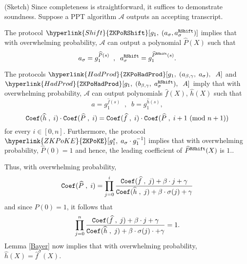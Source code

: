 \documentclass[11pt, lettersize, notitlepage, leqno, footskip=0.6cm]{article}
\newcommand{\mc}{\mathcal}
\newcommand{\be}{\beta}
\newcommand{\what}{\widehat}
\newcommand{\vs}{\vspace{-0.15cm}}
\newcommand{\noin}{\noindent}
\newcommand{\op}{overwhelming probability}
\newcommand{\Mod}[1]{\ (\mathrm{mod}\ #1)}
\numberwithin{equation}{section}
\begin{document}
\begin{prf} (Sketch) Since completeness is straightforward, it suffices to demonstrate soundness. Suppose a PPT algorithm $\mc{A}$ outputs an accepting transcript. 

The protocol $\hyperlink{Shift}{\tt{ZKPoRShift}}[g_1,\;(a_{\sigma}, a^{{\tt{RShift}}}_{\sigma})] $ implies that with \op, $\mc{A}$ can output a polynomial $\what{P}(X)$ such that \vs $$ a_{\sigma} = g_1^{\what{P}(s)}\;\;,\;\; a^{{\tt{RShift}}}_{\sigma} = g_1^{\what{P}^{{\tt{RShift}}}(s)} . $$

\noin The protocols $\hyperlink{HadProd}{\tt{ZKPoHadProd}}[g_1,\;({a}_{\be,\gamma},\;a_{\sigma}),\;\;A] $ and $\hyperlink{HadProd}{\tt{ZKPoHadProd}}[g_1,\;({b}_{\be,\gamma},\;a^{{\tt{RShift}}}_{\sigma}),\;\;A] $ imply that with \op, $\mc{A}$ can output polynomials $\what{f}(X)$, $\what{h}(X)$ such that \vs $$ a = g_1^{\what{f}(s)}\;\;,\;\; b = g_1^{\what{h}(s)}, $$ \vspace{-3mm}  $${\tt{Coef}}(\what{h}\;,\;i)\cdot {\tt{Coef}}(\what{P}\;,\;i) = {\tt{Coef}}(\what{f}\;,\;i)\cdot {\tt{Coef}}(\what{P}\;,\;i+1\Mod{n+1}) $$ for every $i\in [0, n]$. Furthermore, the protocol $\hyperlink{ZKPoKE}{\tt{ZKPoKE}}[g_1^{s},\;a_{\sigma}\cdot g_1^{-1}]$ implies that with \op, $\what{P}(0) = 1$ and hence, the leading coefficient of $\what{P}^{\tt{RShift}}(X)$ is $1$.. 

Thus, with \op, \vs $$ {\tt{Coef}}(\what{P}\;,\;i ) = \prod\limits_{j=0}^i \frac{{\tt{Coef}}(\what{f}\;,\;j) +\be\cdot j + \gamma }{ {\tt{Coef}}(\what{h}\;,\;j)+\be\cdot \sigma(j) + \gamma } $$ and since $P(0)=1$, it follows that \vs $$ \prod\limits_{j=0}^n \frac{ {\tt{Coef}}(\what{f}\;,\;j) +\be\cdot j + \gamma }{ {\tt{Coef}}(\what{h}\;,\;j)+\be\cdot \sigma(j)\cdot + \gamma }  = 1. $$ Lemma \ref{Bayer} now implies that with \op, $\what{h}(X) = \what{f}^{\sigma}(X)$. \end{prf}
\end{document}

